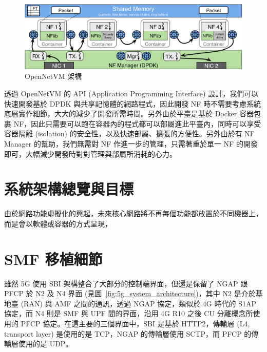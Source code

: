 
\begin{figure}[htbp]
    \centering
    \includegraphics[height=!,width=1\linewidth,keepaspectratio=true]
                    {figures/netvm-arch.png}
                    \caption[OpenNetVM 架構]{{\footnotesize OpenNetVM 架構 \cite{onvm}}}
                    \label{fig:netvm_arch}
\end{figure}

透過 OpenNetVM 的 API (Application Programming Interface) 設計，我們可以快速開發基於 DPDK 與共享記憶體的網路程式，因此開發 NF 時不需要考慮系統底層實作細節，大大的減少了開發所需時間。另外由於平臺是基於 Docker 容器包裹 NF，因此只需要可以跑在容器內的程式都可以部屬進此平臺內，同時可以享受容器隔離 (isolation) 的安全性，以及快速部屬、擴張的方便性。另外由於有 NF Manager 的幫助，我們無需對 NF 作進一步的管理，只需著重於單一 NF 的開發即可，大幅減少開發時對對管理與部屬所消耗的心力。

\section{系統架構總覽與目標}
\label{sec:arch_intro}

由於網路功能虛擬化的興起，未來核心網路將不再每個功能都放置於不同機器上，而是會以軟體或容器的方式呈現，

\section{SMF 移植細節}
\label{sec:smf_porting}

雖然 5G 使用 SBI 架構整合了大部分的控制端界面，但還是保留了 NGAP 跟 PFCP 於 N2 及 N4 界面 (見圖~\ref{fig:5g_system_architecture})，其中 N2 是介於基地臺 (RAN) 與 AMF 之間的通訊，透過 NGAP 協定，類似於 4G 時代的 S1AP 協定，而 N4 則是 SMF 與 UPF 間的界面，沿用 4G R10 之後 CU 分離概念所使用的 PFCP 協定。在這主要的三個界面中，SBI 是基於 HTTP2，傳輸層 (L4, transport layer) 是使用的是 TCP，NGAP 的傳輸層使用 SCTP，而 PFCP 的傳輸層使用的是 UDP。

